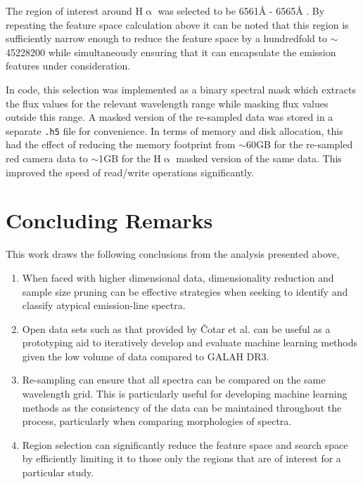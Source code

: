 The region of interest around H$\upalpha$ was selected to be 6561\r{A} - 6565\r{A} \cite{traven2017galah}. By repeating the feature space calculation above it can be noted that this region is sufficiently narrow enough to reduce the feature space by a hundredfold to $\sim$ \num[round-precision=2,round-mode=figures, scientific-notation=true]{45228200} while simultaneously ensuring that it can encapsulate the emission features under consideration. 

In code, this selection was implemented as a binary spectral mask which extracts the flux values for the relevant wavelength range while masking flux values outside this range. A masked version of the re-sampled data was stored in a separate \texttt{.h5} file for convenience. In terms of memory and disk allocation, this had the effect of reducing the memory footprint from $\sim$60GB for the re-sampled red camera data to $\sim$1GB for the H$\upalpha$ masked version of the same data. This improved the speed of read/write operations significantly. 

\section{Concluding Remarks}

This work draws the following conclusions from the analysis presented above,

\begin{enumerate}
\item When faced with higher dimensional data, dimensionality reduction and sample size pruning can be effective strategies when seeking to identify and classify atypical emission-line spectra. 

\item Open data sets such as that provided by Čotar et al. can be useful as a prototyping aid to iteratively develop and evaluate machine learning methods given the low volume of data compared to GALAH DR3. 

\item Re-sampling can ensure that all spectra can be compared on the same wavelength grid. This is particularly useful for developing machine learning methods as the consistency of the data can be maintained throughout the process, particularly when comparing morphologies of spectra.  

\item Region selection can significantly reduce the feature space and search space by efficiently limiting it to those only the regions that are of interest for a particular study. 
\end{enumerate}

